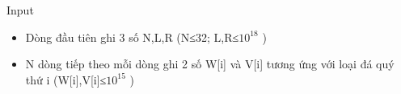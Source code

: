 Input
\begin{itemize}
	\item     Dòng đầu tiên ghi 3 số N,L,R (N≤32; L,R≤$10^{18}$    )   
	\item     N dòng tiếp theo mỗi dòng ghi 2 số W[i] và V[i] tương ứng với loại đá quý thứ i (W[i],V[i]≤$10^{15}$    )   
\end{itemize}
